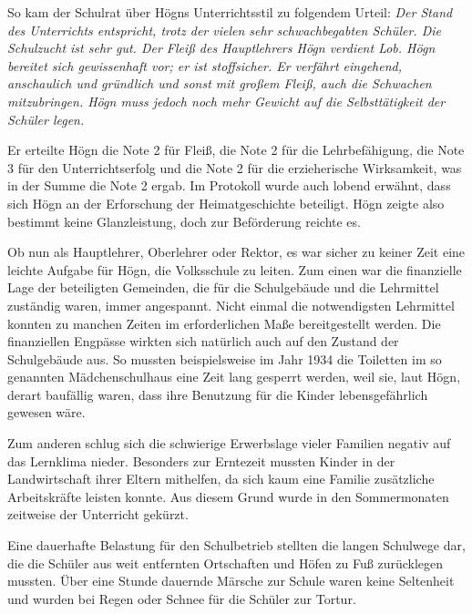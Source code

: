 \documentclass{book}
\begin{document}
So kam der Schulrat über Högns Unterrichtsstil zu folgendem Urteil:
\textit{Der Stand des Unterrichts entspricht, trotz der vielen sehr
schwachbegabten Schüler. Die Schul\-zucht ist sehr gut. Der Fleiß des
Hauptlehrers Högn verdient Lob. Högn bereitet sich gewis\-senhaft vor;
er ist stoffsicher. Er verfährt eingehend, anschaulich und gründlich
und sonst mit großem Fleiß, auch die Schwachen mitzubringen. Högn muss
jedoch noch mehr Gewicht auf die Selbsttätigkeit der Schüler legen.}

Er erteilte Högn die Note 2 für Fleiß, die Note 2 für die
Lehrbefähigung, die Note 3 für den Unterrichtserfolg und die Note 2 für
die erzieherische Wirksamkeit, was in der Summe die Note 2 ergab. Im
Protokoll wurde auch lo\-bend erwähnt, dass sich Högn an der
Erforschung der Heimatgeschichte be\-teiligt. Högn zeigte also bestimmt
keine Glanzleistung, doch zur Beförderung reichte es.

Ob nun als Hauptlehrer, Oberlehrer oder Rektor, es war sicher zu keiner
Zeit eine leichte Aufgabe für Högn, die Volksschule zu leiten. Zum
einen war die finanzielle Lage der beteiligten Gemeinden, die für die
Schulgebäude und die Lehrmittel zuständig waren, immer angespannt.
Nicht einmal die notwen\-digsten Lehrmittel konnten zu manchen Zeiten
im erforderlichen Maße be\-reitgestellt werden. Die finanziellen
Engpässe wirkten sich natürlich auch auf den Zustand der Schulgebäude
aus. So mussten beispielsweise im Jahr 1934 die Toiletten im so
genannten Mädchenschulhaus eine Zeit lang gesperrt wer\-den, weil sie,
laut Högn, derart baufällig waren, dass ihre Benutzung für die Kinder
lebensgefährlich gewesen wäre. 

Zum anderen schlug sich die schwierige Erwerbslage vieler Familien
nega\-tiv auf das Lernklima nieder. Besonders zur Erntezeit mussten
Kinder in der Landwirtschaft ihrer Eltern mithelfen, da sich kaum eine
Familie zusätzliche Arbeitskräfte leisten konnte. Aus diesem Grund
wurde in den Sommermo\-naten zeitweise der Unterricht gekürzt.

Eine dauerhafte Belastung für den Schulbetrieb stellten die langen
Schul\-wege dar, die die Schüler aus weit entfernten Ortschaften und
Höfen zu Fuß zurücklegen mussten. Über eine Stunde dauernde Märsche zur
Schule waren keine Seltenheit und wurden bei Regen oder Schnee für die
Schüler zur Tor\-tur.
\end{document}
